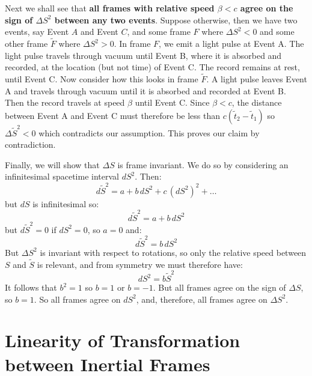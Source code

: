 \documentclass[12pt]{book}
\begin{document}
Next we shall see that {\bf all frames with relative speed $\beta<c$ agree on the sign of $\Delta S^2$ between any two events}.  Suppose otherwise, then we have two events, say Event $A$ and Event $C$, and some frame $F$ where $\Delta S^2<0$ and some other frame $\widetilde{F}$ where $\Delta S^2>0$.  In frame $F$, we emit a light pulse at Event A.  The light pulse travels through vacuum until Event B, where it is absorbed and recorded, at the location (but not time) of Event C.  The record remains at rest, until Event C.
Now consider how this looks in frame $\widetilde{F}$.  A light pulse leaves Event A and travels through vacuum until it is absorbed and recorded at Event B.  Then the record travels at speed $\beta$ until Event C.  Since $\beta < c$, the distance between Event A and Event C must therefore be less than $c(\widetilde{t}_2-\widetilde{t}_1)$ so $\Delta \widetilde{S}^2 < 0$ which contradicts our assumption.  This proves our claim by contradiction.  

Finally, we will show that $\Delta S$ is frame invariant.  We do so by considering an infinitesimal spacetime interval $dS^2$.  Then:
$$d\widetilde{S}^2 = a + b \, dS^2 + c \, (dS^2)^2 + \ldots $$
but $dS$ is infinitesimal so:
$$d\widetilde{S}^2 = a + b \, dS^2$$
but $d\widetilde{S}^2=0$ if $dS^2=0$, so $a=0$ and:
$$d\widetilde{S}^2 = b \, dS^2$$
But $\Delta S^2$ is invariant with respect to rotations, so only the relative speed between $S$ and $\widetilde{S}$ is relevant, and from symmetry we must therefore have:
$$ dS^2 = b \widetilde{S}^2$$
It follows that $b^2=1$ so $b=1$ or $b=-1$.  But all frames agree on the sign of $\Delta S$, so $b=1$.  So all frames agree on $dS^2$, and, therefore, all frames agree on $\Delta S^2$.

\section{Linearity of Transformation between Inertial Frames}
\end{document}
